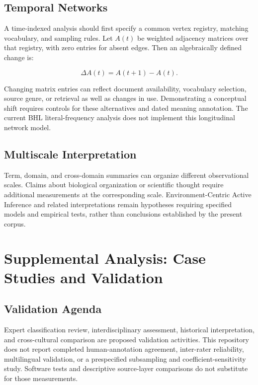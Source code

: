 \documentclass[
]{article}
\numberwithin{equation}{section}
\begin{document}
\subsection{Temporal Networks}\label{temporal-networks}

A time-indexed analysis should first specify a common vertex registry,
matching vocabulary, and sampling rules. Let \(A(t)\) be weighted
adjacency matrices over that registry, with zero entries for absent
edges. Then an algebraically defined change is:

\begin{equation}\label{eq:temporal_network_evolution}
\Delta A(t)=A(t+1)-A(t).
\end{equation}

Changing matrix entries can reflect document availability, vocabulary
selection, source genre, or retrieval as well as changes in use.
Demonstrating a conceptual shift requires controls for these
alternatives and dated meaning annotation. The current BHL
literal-frequency analysis does not implement this longitudinal network
model.

\subsection{Multiscale Interpretation}\label{multiscale-interpretation}

Term, domain, and cross-domain summaries can organize different
observational scales. Claims about biological organization or scientific
thought require additional measurements at the corresponding scale.
Environment-Centric Active Inference and related interpretations remain
hypotheses requiring specified models and empirical tests, rather than
conclusions established by the present corpus.

\clearpage

\section{Supplemental Analysis: Case Studies and
Validation}\label{sec:supplemental_case_studies}

\subsection{Validation Agenda}\label{validation-agenda}

Expert classification review, interdisciplinary assessment, historical
interpretation, and cross-cultural comparison are proposed validation
activities. This repository does not report completed human-annotation
agreement, inter-rater reliability, multilingual validation, or a
prespecified subsampling and coefficient-sensitivity study. Software
tests and descriptive source-layer comparisons do not substitute for
those measurements.
\end{document}
